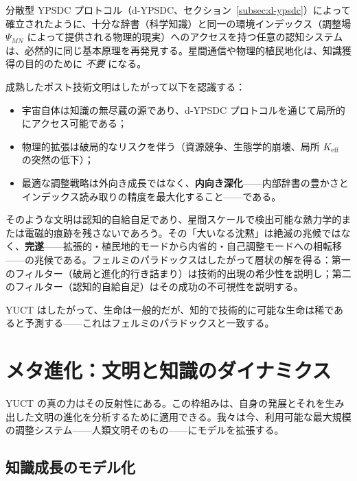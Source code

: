 \documentclass[12pt,a4paper]{article}
\theoremstyle{remark}
\begin{document}
	分散型 YPSDC プロトコル（d-YPSDC、セクション~\ref{subsec:d-ypsdc}）によって確立されたように、十分な辞書（科学知識）と同一の環境インデックス（調整場 \(\Psi_{MN}\) によって提供される物理的現実）へのアクセスを持つ任意の認知システムは、必然的に同じ基本原理を再発見する。星間通信や物理的植民地化は、知識獲得の目的のために \emph{不要} になる。
	
	成熟したポスト技術文明はしたがって以下を認識する：
	\begin{itemize}[leftmargin=*]
		\item 宇宙自体は知識の無尽蔵の源であり、d-YPSDC プロトコルを通じて局所的にアクセス可能である；
		\item 物理的拡張は破局的なリスクを伴う（資源競争、生態学的崩壊、局所 \(K_{\mathrm{eff}}\) の突然の低下）；
		\item 最適な調整戦略は外向き成長ではなく、\textbf{内向き深化}——内部辞書の豊かさとインデックス読み取りの精度を最大化すること——である。
	\end{itemize}
	
	そのような文明は認知的自給自足であり、星間スケールで検出可能な熱力学的または電磁的痕跡を残さないであろう。その「大いなる沈黙」は絶滅の兆候ではなく、\textbf{完遂}——拡張的・植民地的モードから内省的・自己調整モードへの相転移——の兆候である。フェルミのパラドックスはしたがって層状の解を得る：第一のフィルター（破局と進化的行き詰まり）は技術的出現の希少性を説明し；第二のフィルター（認知的自給自足）はその成功の不可視性を説明する。
	
	YUCT はしたがって、生命は一般的だが、知的で技術的に可能な生命は稀であると予測する——これはフェルミのパラドックスと一致する。
	
	\section{メタ進化：文明と知識のダイナミクス}
	\label{sec:meta-evolution}
	
	YUCT の真の力はその反射性にある。この枠組みは、自身の発展とそれを生み出した文明の進化を分析するために適用できる。我々は今、利用可能な最大規模の調整システム——人類文明そのもの——にモデルを拡張する。
	
	\subsection{知識成長のモデル化}
	
\end{document}
